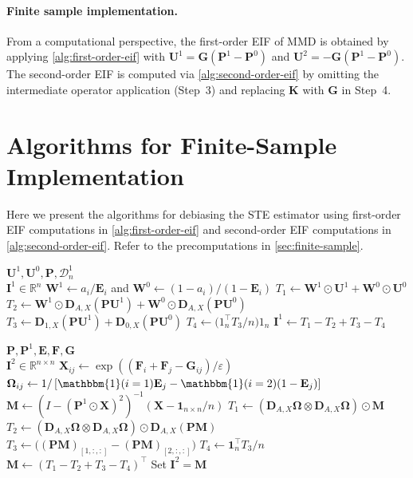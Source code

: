 \documentclass{article}
\theoremstyle{plain}
\theoremstyle{definition}
\theoremstyle{remark}
\newcommand{\off}[1]{\left[#1\right]}
\newcommand{\cD}{\mathcal{D}}
\newcommand{\bX}{\mathbf{X}}
\newcommand{\bD}{\mathbf{D}}
\newcommand{\bE}{\mathbf{E}}
\newcommand{\bU}{\mathbf{U}}
\newcommand{\bI}{\mathbf{I}}
\newcommand{\bF}{\mathbf{F}}
\newcommand{\bG}{\mathbf{G}}
\newcommand{\bK}{\mathbf{K}}
\newcommand{\bW}{\mathbf{W}}
\newcommand{\bM}{\mathbf{M}}
\newcommand{\bP}{\mathbf{P}}
\newcommand{\1}{\mathbbm{1}}
\theoremstyle{plain}
\theoremstyle{definition}
\begin{document}
\paragraph{Finite sample implementation.}
From a computational perspective, the first-order EIF of MMD is obtained by applying \cref{alg:first-order-eif} with $\bU^1 = \bG(\bP^1 - \bP^0)$ and $\bU^2 = -\bG(\bP^1 - \bP^0)$. The second-order EIF is computed via \cref{alg:second-order-eif} by omitting the intermediate operator application (Step~3) and replacing $\bK$ with $\bG$ in Step~4.

\section{Algorithms for Finite-Sample Implementation}\label{appendix:finite_sample_alg}

Here we present the algorithms for debiasing the STE estimator using first-order EIF computations in \cref{alg:first-order-eif} and second-order EIF computations in \cref{alg:second-order-eif}. Refer to the precomputations in \cref{sec:finite-sample}.

\begin{algorithm}[tb]
\caption{First-order EIF evaluations}
\label{alg:first-order-eif}
\begin{algorithmic}[1]
 $\bU^1,\bU^0,\bP, \cD_n^1$ \\
 $\bI^1 \in \mathbb R^n$
\STATE $\bW^1 \gets a_i/\bE_i$ and $\bW^0 \gets (1-a_i)/(1-\bE_i)$
\STATE $T_1 \gets \bW^1 \odot \bU^1 + \bW^0 \odot \bU^0$
\STATE $T_2 \gets \bW^1 \odot \bD_{A,X}(\bP\bU^1) + \bW^0 \odot \bD_{A,X}(\bP\bU^0)$
\STATE $T_3 \gets \bD_{1,X}(\bP\bU^1) + \bD_{0,X}(\bP\bU^0)$
\STATE $T_4 \gets \mathbf (1_n^\top T_3 / n) 1_n$
\STATE $\bI^1 \gets T_1 - T_2 + T_3 - T_4$
\end{algorithmic}
\end{algorithm}


\begin{algorithm}[tb]
\caption{Second-order EIF evaluations}
\label{alg:second-order-eif}
\begin{algorithmic}[1]
  $\bP,\bP^1, \bE,\bF,\bG$ \\
  $\bI^2 \in \mathbb R^{n\times n}$
\STATE $\bX_{ij} \gets \exp((\bF_i+\bF_j-\bG_{ij})/\varepsilon)$
\STATE $\mathbf\Omega_{ij} \gets 1 / \off{\1(i=1)\bE_j - \1(i=2)(1-\bE_j)}$
\STATE $\bM \gets (I-(\bP^1\odot\bX)^2)^{-1}(\bX-\mathbf 1_{n\times n}/n)$
    \STATE $T_1 \gets (\bD_{A,X}\mathbf\Omega \otimes \bD_{A,X}\mathbf\Omega)\odot\bM$
    \STATE $T_2 \gets (\bD_{A,X}\mathbf\Omega \otimes \bD_{A,X}\mathbf\Omega)\odot\bD_{A,X}(\bP\bM)$
    \STATE $T_3 \gets \big((\bP\bM)_{[1,:,:]}-(\bP\bM)_{[2,:,:]}\big)$
    \STATE $T_4 \gets \mathbf 1_n^\top T_3/n$
    \STATE $\bM \gets (T_1 - T_2 + T_3 - T_4)^\top$
\ENDFOR
\STATE Set $\bI^2 = \bM$
\end{algorithmic}
\end{algorithm}
\end{document}
